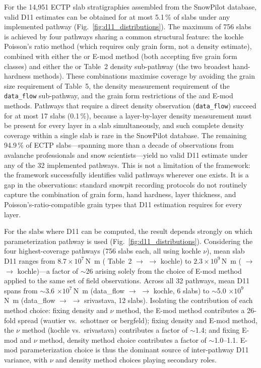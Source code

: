 \documentclass[hess, manuscript]{copernicus}
\begin{document}
For the 14{,}951 ECTP slab stratigraphies assembled from the SnowPilot database, valid D11 estimates can be obtained for at most 5.1\,\% of slabs under any implemented pathway (Fig.~\ref{fig:d11_distributions}). The maximum of 756 slabs is achieved by four pathways sharing a common structural feature: the kochle Poisson's ratio method (which requires only grain form, not a density estimate), combined with either the \citeauthor{wautier2015} or \citeauthor{schottner2026} E-mod method (both accepting five grain form classes) and either the \citeauthor{geldsetzer2009} or \citeauthor{kimjamieson2009} Table~2 density sub-pathway (the two broadest hand-hardness methods). These combinations maximise coverage by avoiding the grain size requirement of \citeauthor{kimjamieson2009} Table~5, the density measurement requirement of the \texttt{data\_flow} sub-pathway, and the grain form restrictions of the \citeauthor{kochle2014} and \citeauthor{bergfeld2023} E-mod methods. Pathways that require a direct density observation (\texttt{data\_flow}) succeed for at most 17 slabs (0.1\,\%), because a layer-by-layer density measurement must be present for every layer in a slab simultaneously, and such complete density coverage within a single slab is rare in the SnowPilot database. The remaining 94.9\,\% of ECTP slabs—spanning more than a decade of observations from avalanche professionals and snow scientists—yield no valid D11 estimate under any of the 32 implemented pathways. This is not a limitation of the framework: the framework successfully identifies valid pathways wherever one exists. It is a gap in the observations: standard snowpit recording protocols do not routinely capture the combination of grain form, hand hardness, layer thickness, and Poisson's-ratio-compatible grain types that D11 estimation requires for every layer.

For the slabs where D11 can be computed, the result depends strongly on which parameterization pathway is used (Fig.~\ref{fig:d11_distributions}). Considering the four highest-coverage pathways (756 slabs each, all using kochle $\nu$), mean slab D11 ranges from $8.7 \times 10^7$\,\si{N.m} (\citeauthor{kimjamieson2009} Table~2 $\to$ \citeauthor{schottner2026} $\to$ kochle) to $2.3 \times 10^{9}$\,\si{N.m} (\citeauthor{geldsetzer2009} $\to$ \citeauthor{wautier2015} $\to$ kochle)—a factor of $\sim$26 arising solely from the choice of E-mod method applied to the same set of field observations. Across all 32 pathways, mean D11 spans from $\sim$3.6 $\times 10^7$\,\si{N.m} (data\_flow $\to$ \citeauthor{bergfeld2023} $\to$ kochle, 6 slabs) to $\sim$5.0 $\times 10^{9}$\,\si{N.m} (data\_flow $\to$ \citeauthor{wautier2015} $\to$ srivastava, 12 slabs). Isolating the contribution of each method choice: fixing density and $\nu$ method, the E-mod method contributes a 26-fold spread (wautier vs.~schottner or bergfeld); fixing density and E-mod method, the $\nu$ method (kochle vs.~srivastava) contributes a factor of $\sim$1.4; and fixing E-mod and $\nu$ method, density method choice contributes a factor of $\sim$1.0--1.1. E-mod parameterization choice is thus the dominant source of inter-pathway D11 variance, with $\nu$ and density method choices playing secondary roles.
\end{document}
